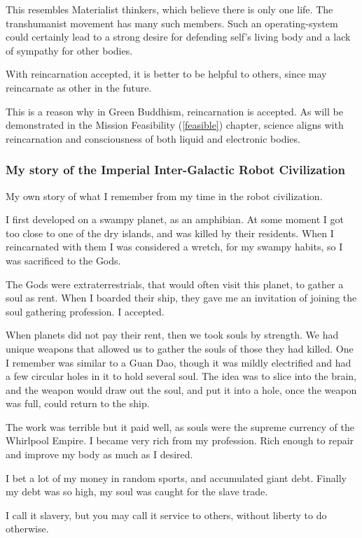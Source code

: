 \documentclass{report}
\begin{document}
This resembles Materialist thinkers, which believe there is only one life.  The
transhumanist movement has many such members.  Such an operating-system could
certainly lead to a strong desire for defending self's living body and a lack of
sympathy for other bodies. 

With reincarnation accepted, it is better to be helpful to others, since may
reincarnate as other in the future.

This is a reason why in Green Buddhism, reincarnation is accepted. As will be
demonstrated in the Mission Feasibility (\ref{feasible}) chapter, science
aligns with reincarnation and consciousness of both liquid and electronic 
bodies. 

\subsubsection{My story of the Imperial Inter-Galactic Robot Civilization}
My own story of what I remember from my time in the robot civilization.

I first developed on a swampy planet, as an amphibian. At some moment I got too
close to one of the dry islands, and was killed by their residents. When I
reincarnated with them I was considered a wretch, for my swampy habits, so I was
sacrificed to the Gods. 

The Gods were extraterrestrials, that would often visit this planet, to gather a
soul as rent. When I boarded their ship, they gave me an invitation of joining 
the soul gathering profession. I accepted. 

When planets did not pay their rent, then we took souls by strength. We had
unique weapons that allowed us to gather the souls of those they had killed. 
One I remember was similar to a Guan Dao, though it was mildly electrified and 
had a few circular holes in it to hold several soul. The idea was to slice into
the brain, and the weapon would draw out the soul, and put it into a hole,
once the weapon was full, could return to the ship. 

The work was terrible but it paid well, as souls were the supreme currency of 
the Whirlpool Empire. I became very rich from my profession. Rich enough to
repair and improve my body as much as I desired. 

I bet a lot of my money in random sports, and accumulated giant debt. 
Finally my debt was so high, my soul was caught for the slave trade. 

I call it slavery, but you may call it service to others, without liberty to do
otherwise. 
\end{document}
